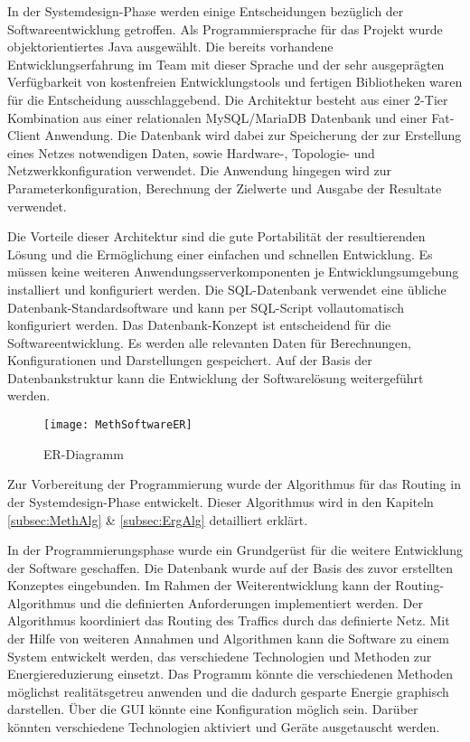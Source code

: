 In der Systemdesign-Phase werden einige Entscheidungen bezüglich der Softwareentwicklung getroffen. Als Programmiersprache für das Projekt wurde objektorientiertes Java ausgewählt. Die bereits vorhandene Entwicklungserfahrung im Team mit dieser Sprache und der sehr ausgeprägten Verfügbarkeit von kostenfreien Entwicklungstools und fertigen Bibliotheken waren für die Entscheidung ausschlaggebend.
Die Architektur besteht aus einer 2-Tier Kombination aus einer relationalen MySQL/MariaDB Datenbank und einer Fat-Client Anwendung. Die Datenbank wird dabei zur Speicherung der zur Erstellung eines Netzes notwendigen Daten, sowie Hardware-, Topologie- und Netzwerkkonfiguration verwendet. Die Anwendung hingegen wird zur Parameterkonfiguration, Berechnung der Zielwerte und Ausgabe der Resultate verwendet.


Die Vorteile dieser Architektur sind die gute Portabilität der resultierenden Lösung und die Ermöglichung einer einfachen und schnellen Entwicklung. Es müssen keine weiteren Anwendungsserverkomponenten je Entwicklungsumgebung installiert und konfiguriert werden. Die SQL-Datenbank verwendet eine übliche Datenbank-Standardsoftware und kann per SQL-Script vollautomatisch konfiguriert werden.
Das Datenbank-Konzept ist entscheidend für die Softwareentwicklung. Es werden alle relevanten Daten für Berechnungen, Konfigurationen und Darstellungen gespeichert. Auf der Basis der Datenbankstruktur kann die Entwicklung der Softwarelösung weitergeführt werden.


\begin{figure}[!ht]
	\centering
	\texttt{[image: MethSoftwareER]}
	\caption{ER-Diagramm} %
	\label{fig:MethSoftwareER}
\end{figure}


Zur Vorbereitung der Programmierung wurde der Algorithmus für das Routing in der Systemdesign-Phase entwickelt.  Dieser Algorithmus wird in den  Kapiteln \ref{subsec:MethAlg} \& \ref{subsec:ErgAlg} detailliert erklärt.


In der Programmierungsphase wurde ein Grundgerüst für die weitere Entwicklung der Software geschaffen. Die Datenbank wurde auf der Basis des zuvor erstellten Konzeptes eingebunden. Im Rahmen der Weiterentwicklung kann der Routing-Algorithmus und die definierten Anforderungen implementiert werden. Der Algorithmus koordiniert das Routing des Traffics durch das definierte Netz. Mit der Hilfe von weiteren Annahmen und Algorithmen kann die Software zu einem System entwickelt werden, das verschiedene Technologien und Methoden zur Energiereduzierung einsetzt. Das Programm könnte die verschiedenen Methoden möglichst realitätsgetreu anwenden und die dadurch gesparte Energie graphisch darstellen. Über die GUI könnte eine Konfiguration möglich sein.  Darüber könnten verschiedene Technologien aktiviert und Geräte ausgetauscht werden. 


